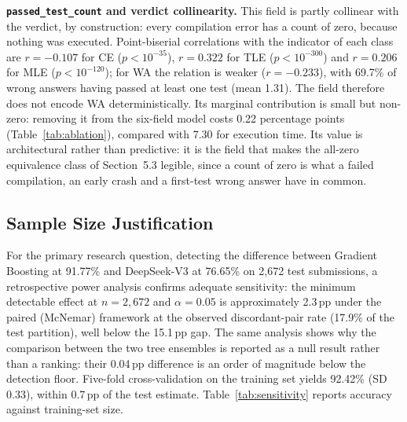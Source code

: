 \documentclass[acmsmall]{acmart}
\begin{document}
\textbf{\texttt{passed\_test\_count} and verdict collinearity.} This field is
partly collinear with the verdict, by construction: every compilation error has
a count of zero, because nothing was executed. Point-biserial correlations with
the indicator of each class are $r=-0.107$ for CE ($p<10^{-35}$), $r=0.322$ for
TLE ($p<10^{-300}$) and $r=0.206$ for MLE ($p<10^{-120}$); for WA the relation
is weaker ($r=-0.233$), with 69.7\% of wrong answers having passed at least one
test (mean 1.31). The field therefore does not encode WA deterministically. Its
marginal contribution is small but non-zero: removing it from the six-field
model costs 0.22 percentage points (Table~\ref{tab:ablation}), compared with
7.30 for execution time. Its value is architectural rather than predictive: it
is the field that makes the all-zero equivalence class of Section~5.3 legible,
since a count of zero is what a failed compilation, an early crash and a
first-test wrong answer have in common.


\subsection{Sample Size Justification}

For the primary research question, detecting the difference between Gradient
Boosting at 91.77\% and DeepSeek-V3 at 76.65\% on 2,672 test submissions, a
retrospective power analysis confirms adequate sensitivity: the minimum
detectable effect at $n=2{,}672$ and $\alpha=0.05$ is approximately 2.3\,pp
under the paired (McNemar) framework at the observed discordant-pair rate
(17.9\% of the test partition), well below the 15.1\,pp gap. The same analysis shows why the comparison between
the two tree ensembles is reported as a null result rather than a ranking: their
0.04\,pp difference is an order of magnitude below the detection floor.
Five-fold cross-validation on the training set yields 92.42\% (SD 0.33), within
0.7\,pp of the test estimate. Table~\ref{tab:sensitivity} reports accuracy
against training-set size.
\end{document}
